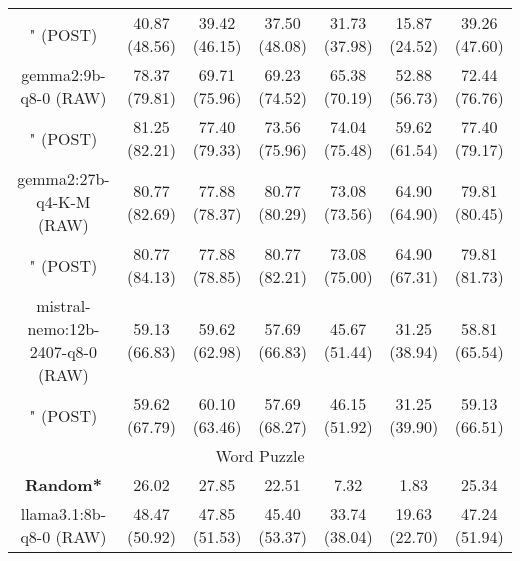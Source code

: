 \begin{table}[]
{\begin{tabular}{ccccccc}
        

        \multicolumn{1}{c|}{" (POST)} & 40.87 (48.56) & 39.42 (46.15) & \multicolumn{1}{c|}{37.50 (48.08)} & 31.73 (37.98) & \multicolumn{1}{c|}{15.87 (24.52)} & 39.26 (47.60) \\
        \cline{1-7}
        

        \multicolumn{1}{c|}{gemma2:9b-q8-0 (RAW)} & 78.37 (79.81) & 69.71 (75.96) & \multicolumn{1}{c|}{69.23 (74.52)} & 65.38 (70.19) & \multicolumn{1}{c|}{52.88 (56.73)} & 72.44 (76.76) \\
        
        

        \multicolumn{1}{c|}{" (POST)} & 81.25 (82.21) & 77.40 (79.33) & \multicolumn{1}{c|}{73.56 (75.96)} & 74.04 (75.48) & \multicolumn{1}{c|}{59.62 (61.54)} & 77.40 (79.17) \\
        \cline{1-7}
        

        \multicolumn{1}{c|}{gemma2:27b-q4-K-M (RAW)} & 80.77 (82.69) & 77.88 (78.37) & \multicolumn{1}{c|}{80.77 (80.29)} & 73.08 (73.56) & \multicolumn{1}{c|}{64.90 (64.90)} & 79.81 (80.45) \\
        
        

        \multicolumn{1}{c|}{" (POST)} & 80.77 (84.13) & 77.88 (78.85) & \multicolumn{1}{c|}{80.77 (82.21)} & 73.08 (75.00) & \multicolumn{1}{c|}{64.90 (67.31)} & 79.81 (81.73) \\
        \cline{1-7}
        

        \multicolumn{1}{c|}{mistral-nemo:12b-2407-q8-0 (RAW)} & 59.13 (66.83) & 59.62 (62.98) & \multicolumn{1}{c|}{57.69 (66.83)} & 45.67 (51.44) & \multicolumn{1}{c|}{31.25 (38.94)} & 58.81 (65.54) \\
        
        

        \multicolumn{1}{c|}{" (POST)} & 59.62 (67.79) & 60.10 (63.46) & \multicolumn{1}{c|}{57.69 (68.27)} & 46.15 (51.92) & \multicolumn{1}{c|}{31.25 (39.90)} & 59.13 (66.51) \\
        \cline{1-7}
        
\hline
\multicolumn{7}{c}{Word Puzzle} \\ \hline
\multicolumn{1}{c|}{\textbf{Random*}} & 26.02 & 27.85 & \multicolumn{1}{c|}{22.51} & 7.32 & \multicolumn{1}{c|}{1.83} & 25.34 \\ \hline

        \multicolumn{1}{c|}{llama3.1:8b-q8-0 (RAW)} & 48.47 (50.92) & 47.85 (51.53) & \multicolumn{1}{c|}{45.40 (53.37)} & 33.74 (38.04) & \multicolumn{1}{c|}{19.63 (22.70)} & 47.24 (51.94) \\
        

\end{tabular}}
\end{table}
